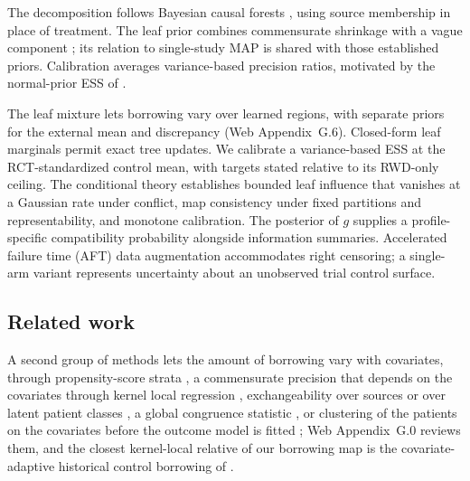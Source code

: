 The decomposition follows Bayesian causal forests \citep{Hahn2020BCF}, using source membership in place of treatment. The leaf prior combines commensurate shrinkage \citep{Hobbs2011} with a vague component \citep{schmidli2014robust}; its relation to single-study MAP \citep{RoverFriede2025} is shared with those established priors. Calibration averages variance-based precision ratios, motivated by the normal-prior ESS of \citet{neuenschwander2020}.

The leaf mixture lets borrowing vary over learned regions, with separate priors for the external mean and discrepancy (Web Appendix~G.6). Closed-form leaf marginals permit exact tree updates. We calibrate a variance-based ESS at the RCT-standardized control mean, with targets stated relative to its RWD-only ceiling. The conditional theory establishes bounded leaf influence that vanishes at a Gaussian rate under conflict, map consistency under fixed partitions and representability, and monotone calibration. The posterior of $g$ supplies a profile-specific compatibility probability alongside information summaries. Accelerated failure time (AFT) data augmentation accommodates right censoring; a single-arm variant represents uncertainty about an unobserved trial control surface.

\subsection{Related work}
\label{sec:related}

A second group of methods lets the amount of borrowing vary with covariates, through propensity-score strata \citep{Wang2019PSPP,Chen2020PSCL}, a commensurate precision that depends on the covariates through kernel local regression \citep{Jin2023CAHB}, exchangeability over sources or over latent patient classes \citep{Kaizer2018MEM,Kotalik2021,Alt2024LEAP}, a global congruence statistic \citep{Jiang2023elastic}, or clustering of the patients on the covariates before the outcome model is fitted \citep{Bi2026SAMHC,Chandra2023}; Web Appendix~G.0 reviews them, and the closest kernel-local relative of our borrowing map is the covariate-adaptive historical control borrowing of \citet{Jin2023CAHB}.

